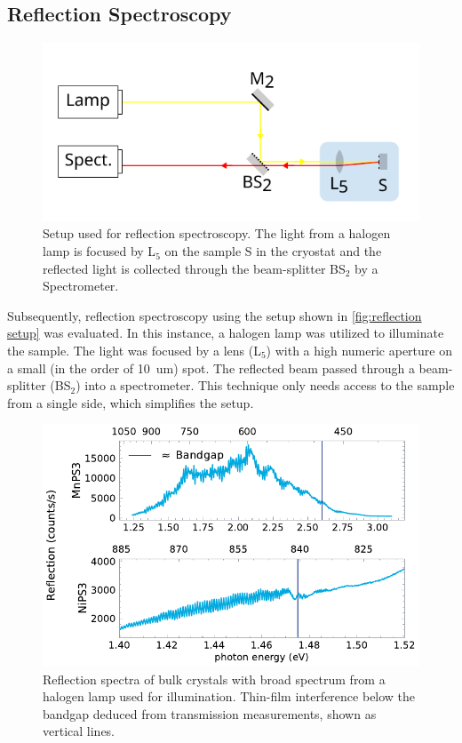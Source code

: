 \documentclass[
	twoside,
	parskip=half,
	a4paper,
]{scrbook}
\begin{document}
\subsection{Reflection Spectroscopy}
\begin{figure}
	\centering
	\includegraphics{../figures/setup_reflection.pdf}
	\caption{Setup used for reflection spectroscopy. The light from a halogen lamp is focused by L$_5$ on the sample S in the cryostat and the reflected light is collected through the beam-splitter BS$_2$ by a Spectrometer.}
	\label{fig:reflection setup}
\end{figure}
Subsequently, reflection spectroscopy using the setup shown in \autoref{fig:reflection setup} was evaluated.
In this instance, a halogen lamp was utilized to illuminate the sample.
The light was focused by a lens (L$_5$) with a high numeric aperture on a small (in the order of \SI{10}{um}) spot.
The reflected beam passed through a beam-splitter (BS$_2$) into a spectrometer.
This technique only needs access to the sample from a single side, which simplifies the setup.
\begin{figure}
	\centering
	\includegraphics{../figures/2024-03-14 reflection spectra.pdf}
	\caption{Reflection spectra of bulk crystals with broad spectrum from a halogen lamp used for illumination. Thin-film interference below the bandgap deduced from transmission measurements, shown as vertical lines.}
	\label{fig:reflection spectra}
\end{figure}
\end{document}
